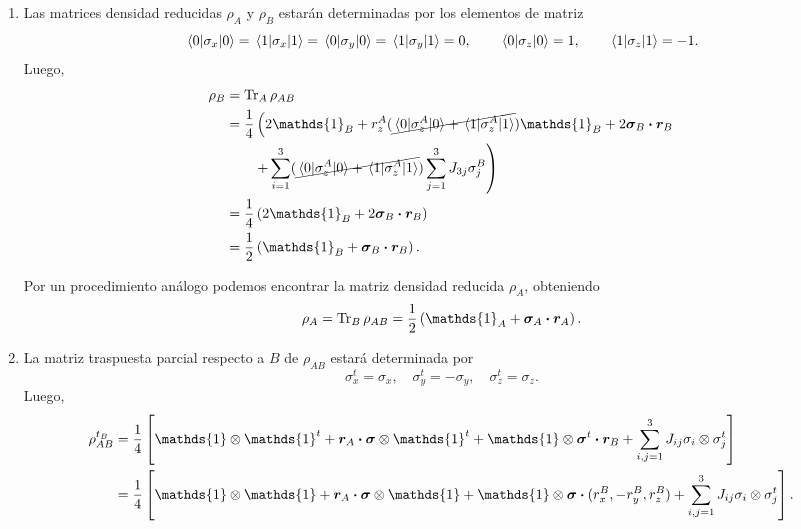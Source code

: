 \documentclass{scrartcl}
\newcommand{\inv}[1]{\frac{1}{#1}}
\renewcommand{\vb}[1]{\bm{#1}}
\DeclareRobustCommand{\[}{\begin{equation}}
\DeclareRobustCommand{\]}{\end{equation}}
\begin{document}
\begin{enumerate}
\begin{enumerate}
        
        \item Las matrices densidad reducidas $\rho_A$ y $\rho_B$ estarán determinadas por los elementos de matriz
        \[ \mel{0}{\sigma_x}{0} = \mel{1}{\sigma_x}{1} = \mel{0}{\sigma_y}{0} = \mel{1}{\sigma_y}{1} = 0, \quad \quad \mel{0}{\sigma_z}{0} = 1, \quad \quad \mel{1}{\sigma_z}{1} = -1. \]
        Luego,
        \begin{align}
            \rho_B &= \Tr_A \rho_{AB} \\
                &= \inv{4} \left( 2 \mathds{1}_B + r^A_z (\cancel{\mel{0}{\sigma_z^A}{0} + \mel{1}{\sigma_z^A}{1}}) \mathds{1}_B + 2 \vb{\sigma}_B \vdot \vb{r}_B \right. \\
                &\quad \quad \left. + \sum_{i = 1}^3 (\cancel{\mel{0}{\sigma_z^A}{0} + \mel{1}{\sigma_z^A}{1}}) \sum_{j = 1}^3 J_{3j} \sigma^B_j \right) \\
                &= \inv{4} \left( 2 \mathds{1}_B + 2 \vb{\sigma}_B \vdot \vb{r}_B \right) \\
                &= \inv{2} \left( \mathds{1}_B + \vb{\sigma}_B \vdot \vb{r}_B \right).
        \end{align}
        
        Por un procedimiento análogo podemos encontrar la matriz densidad reducida $\rho_A$, obteniendo
        \[ \rho_A = \Tr_B \rho_{AB} = \inv{2} \left( \mathds{1}_A + \vb{\sigma}_A \vdot \vb{r}_A \right). \]
        
        
        \item La matriz traspuesta parcial respecto a $B$ de $\rho_{AB}$ estará determinada por
        \[ \sigma_x^t = \sigma_x, \quad \sigma_y^t = -\sigma_y, \quad \sigma_z^t = \sigma_z. \]
        Luego,
        \begin{align}
            \rho_{AB}^{t_B} &= \inv{4} \left[ \mathds{1} \otimes \mathds{1}^t + \vb{r}_A \vdot \vb{\sigma} \otimes \mathds{1}^t + \mathds{1} \otimes \vb{\sigma}^t \vdot \vb{r}_B + \sum_{i, j = 1}^3 J_{ij} \sigma_i \otimes \sigma_j^t \right] \\
                &= \inv{4} \left[ \mathds{1} \otimes \mathds{1} + \vb{r}_A \vdot \vb{\sigma} \otimes \mathds{1} + \mathds{1} \otimes \vb{\sigma} \vdot (r_x^B, -r_y^B, r_z^B) + \sum_{i, j = 1}^3 J_{ij} \sigma_i \otimes \sigma_j^t \right].
        \end{align}
        

\end{enumerate}
\end{enumerate}
\end{document}
